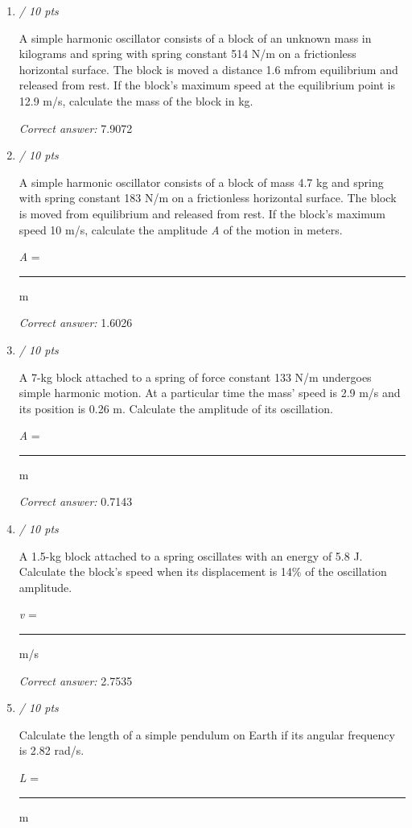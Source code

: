 \documentclass[11pt]{article}
\begin{document}
\begin{enumerate}[leftmargin=*,label=\textbf{Question \arabic*.}]
\item \hfill \textit{/ 10 pts}

A simple harmonic oscillator consists of a block of an unknown mass in kilograms and spring with spring constant 514 N/m on a frictionless horizontal surface. The block is moved a distance 1.6 mfrom equilibrium and released from rest. If the block's maximum speed at the equilibrium point is 12.9 m/s, calculate the mass of the block in kg.

\textit{Correct answer: } 7.9072

\item \hfill \textit{/ 10 pts}

A simple harmonic oscillator consists of a block of mass 4.7 kg and spring with spring constant 183 N/m on a frictionless horizontal surface. The block is moved from equilibrium and released from rest. If the block's maximum speed 10 m/s, calculate the amplitude \emph{A} of the motion in meters.



\emph{A} = \rule{2cm}{0.4pt} m

\textit{Correct answer: } 1.6026

\item \hfill \textit{/ 10 pts}

A 7-kg block attached to a spring of force constant 133 N/m undergoes simple harmonic motion. At a particular time the mass' speed is 2.9 m/s and its position is 0.26 m. Calculate the amplitude of its oscillation.



\emph{A }= \rule{2cm}{0.4pt} m

\textit{Correct answer: } 0.7143

\item \hfill \textit{/ 10 pts}

A 1.5-kg block attached to a spring oscillates with an energy of 5.8 J. Calculate the block's speed when its displacement is 14\% of the oscillation amplitude.



\emph{v} = \rule{2cm}{0.4pt} m/s

\textit{Correct answer: } 2.7535

\item \hfill \textit{/ 10 pts}

Calculate the length of a simple pendulum on Earth if its angular frequency is 2.82 rad/s.



 \emph{L} = \rule{2cm}{0.4pt} m


\end{enumerate}
\end{document}
